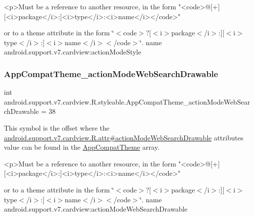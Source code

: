 \begin{DoxyVerb}      <p>Must be a reference to another resource, in the form "<code>@[+][<i>package</i>:]<i>type</i>:<i>name</i></code>"
\end{DoxyVerb}
 or to a theme attribute in the form \char`\"{}$<$code$>$?\mbox{[}$<$i$>$package$<$/i$>$\+:\mbox{]}\mbox{[}$<$i$>$type$<$/i$>$\+:\mbox{]}$<$i$>$name$<$/i$>$$<$/code$>$\char`\"{}.  name android.\+support.\+v7.\+cardview\+:action\+Mode\+Style \mbox{\label{classandroid_1_1support_1_1v7_1_1cardview_1_1R_1_1styleable_abebfa202c2e142724eca48f1c73fdd66}} 
\subsubsection{\texorpdfstring{App\+Compat\+Theme\+\_\+action\+Mode\+Web\+Search\+Drawable}{AppCompatTheme\_actionModeWebSearchDrawable}}
{\footnotesize\ttfamily int android.\+support.\+v7.\+cardview.\+R.\+styleable.\+App\+Compat\+Theme\+\_\+action\+Mode\+Web\+Search\+Drawable = 38\hspace{0.3cm}{\ttfamily [static]}}

This symbol is the offset where the \hyperlink{classandroid_1_1support_1_1v7_1_1cardview_1_1R_1_1attr_a97da397e6e57874c77134e0107d32083}{android.\+support.\+v7.\+cardview.\+R.\+attr\#action\+Mode\+Web\+Search\+Drawable} attribute\textquotesingle{}s value can be found in the \hyperlink{classandroid_1_1support_1_1v7_1_1cardview_1_1R_1_1styleable_a52e6f69f954ecc2622d72c0b4d298938}{App\+Compat\+Theme} array.

\begin{DoxyVerb}      <p>Must be a reference to another resource, in the form "<code>@[+][<i>package</i>:]<i>type</i>:<i>name</i></code>"
\end{DoxyVerb}
 or to a theme attribute in the form \char`\"{}$<$code$>$?\mbox{[}$<$i$>$package$<$/i$>$\+:\mbox{]}\mbox{[}$<$i$>$type$<$/i$>$\+:\mbox{]}$<$i$>$name$<$/i$>$$<$/code$>$\char`\"{}.  name android.\+support.\+v7.\+cardview\+:action\+Mode\+Web\+Search\+Drawable \mbox{\label{classandroid_1_1support_1_1v7_1_1cardview_1_1R_1_1styleable_ab6fbca9d79a6ce0b5d32ae5bec46bb2f}} 
